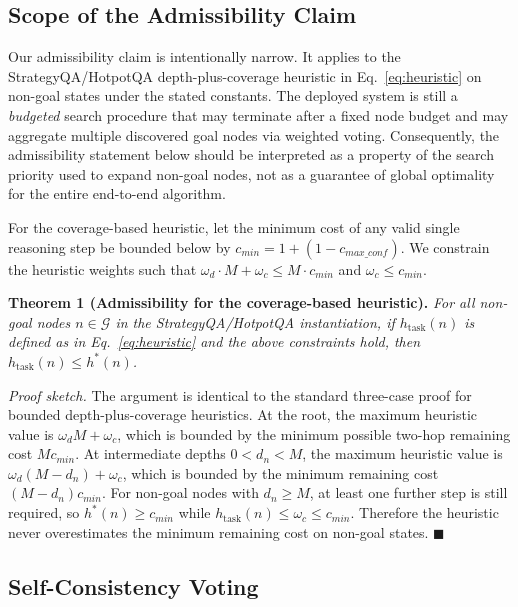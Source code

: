 \documentclass[11pt]{article}
\begin{document}
\subsection{Scope of the Admissibility Claim}
\label{sec:admissibility}

Our admissibility claim is intentionally narrow. It applies to the StrategyQA/HotpotQA depth-plus-coverage heuristic in Eq.~\eqref{eq:heuristic} on non-goal states under the stated constants. The deployed system is still a \emph{budgeted} search procedure that may terminate after a fixed node budget and may aggregate multiple discovered goal nodes via weighted voting. Consequently, the admissibility statement below should be interpreted as a property of the search priority used to expand non-goal nodes, not as a guarantee of global optimality for the entire end-to-end algorithm.

For the coverage-based heuristic, let the minimum cost of any valid single reasoning step be bounded below by $c_{min} = 1 + (1 - c_{max\_conf})$. We constrain the heuristic weights such that $\omega_d \cdot M + \omega_c \le M \cdot c_{min}$ and $\omega_c \le c_{min}$.

\textbf{Theorem 1 (Admissibility for the coverage-based heuristic).} \textit{For all non-goal nodes $n \in \mathcal{G}$ in the StrategyQA/HotpotQA instantiation, if $h_{\text{task}}(n)$ is defined as in Eq.~\eqref{eq:heuristic} and the above constraints hold, then $h_{\text{task}}(n) \le h^*(n)$.}

\textit{Proof sketch.} The argument is identical to the standard three-case proof for bounded depth-plus-coverage heuristics. At the root, the maximum heuristic value is $\omega_d M + \omega_c$, which is bounded by the minimum possible two-hop remaining cost $M c_{min}$. At intermediate depths $0 < d_n < M$, the maximum heuristic value is $\omega_d(M-d_n) + \omega_c$, which is bounded by the minimum remaining cost $(M-d_n)c_{min}$. For non-goal nodes with $d_n \ge M$, at least one further step is still required, so $h^*(n) \ge c_{min}$ while $h_{\text{task}}(n) \le \omega_c \le c_{min}$. Therefore the heuristic never overestimates the minimum remaining cost on non-goal states. $\blacksquare$



\subsection{Self-Consistency Voting}
\end{document}

